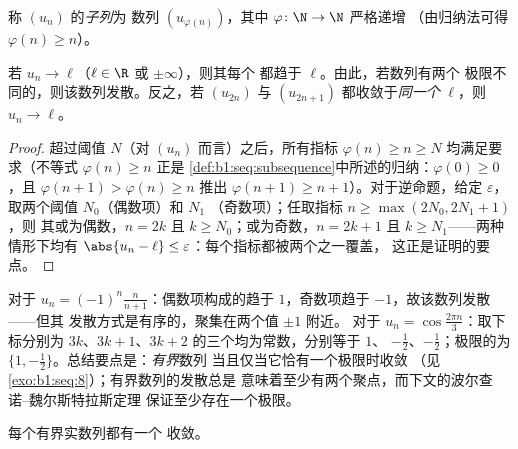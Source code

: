 \begin{definition}[子列]\label{def:b1:seq:subsequence}
称 $(u_n)$ 的\emph{子列}为
数列 $(u_{\varphi(n)})$，其中 $\varphi \colon \N \to \N$ 严格递增
（由归纳法可得 $\varphi(n) \geq n$）。
\end{definition}

\begin{proposition}\label{prop:b1:seq:subsequences}
若 $u_n \to \ell$（$\ell \in \R$ 或 $\pm\infty$），则其每个
都趋于 $\ell$。由此，若数列有两个
极限不同的，则该数列发散。反之，若 $(u_{2n})$ 与
$(u_{2n+1})$ 都收敛于\emph{同一个} $\ell$，则 $u_n \to
\ell$。
\end{proposition}

\begin{proof}
超过阈值 $N$（对 $(u_n)$ 而言）之后，所有指标 $\varphi(n) \geq n
\geq N$ 均满足要求（不等式 $\varphi(n) \geq n$ 正是
\cref{def:b1:seq:subsequence}中所述的归纳：$\varphi(0)
\geq 0$，且 $\varphi(n+1) > \varphi(n) \geq n$ 推出
$\varphi(n+1) \geq n + 1$）。对于逆命题，给定
$\varepsilon$，取两个阈值 $N_0$（偶数项）和 $N_1$
（奇数项）；任取指标 $n \geq \max(2N_0, 2N_1 + 1)$，则
其或为偶数，$n = 2k$ 且 $k \geq N_0$；或为奇数，$n = 2k+1$ 且
$k \geq N_1$——两种情形下均有 $\abs{u_n - \ell} \leq
\varepsilon$：每个指标都被两个之一覆盖，
这正是证明的要点。
\end{proof}

\begin{example}[子列极限]\label{ex:b1:seq:sublimits}
对于 $u_n = (-1)^n \frac{n}{n+1}$：偶数项构成的趋于
$1$，奇数项趋于 $-1$，故该数列发散——但其
发散方式是有序的，聚集在两个值 $\pm 1$ 附近。
对于 $u_n = \cos\frac{2\pi n}{3}$：取下标分别为
$3k$、$3k + 1$、$3k + 2$ 的三个均为常数，分别等于 $1$、
$-\frac12$、$-\frac12$；极限的为 $\{1,
-\frac12\}$。总结要点是：\emph{有界}数列
当且仅当它恰有一个极限时收敛
（见\cref{exo:b1:seq:8}）；有界数列的发散总是
意味着至少有两个聚点，而下文的波尔查诺--魏尔斯特拉斯定理
保证至少存在一个极限。
\end{example}

\begin{theorem}\label{thm:b1:seq:bw}
每个有界实数列都有一个
收敛。
\end{theorem}

